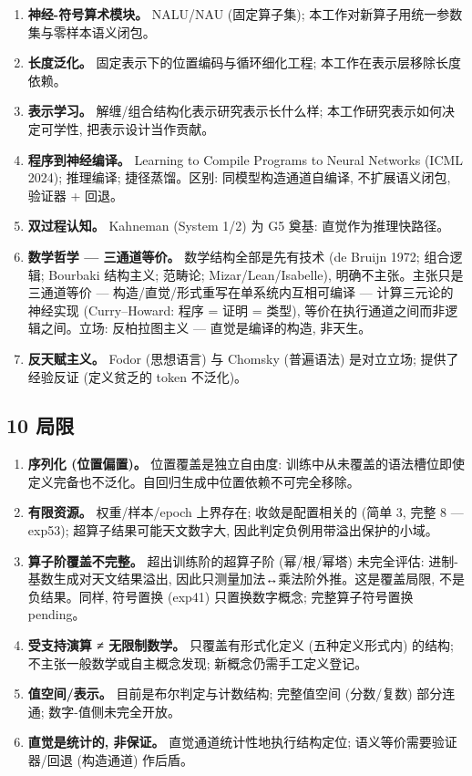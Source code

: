 \documentclass[
]{article}
\providecommand{\tightlist}{%
  \setlength{\itemsep}{0pt}\setlength{\parskip}{0pt}}
\begin{document}
\begin{enumerate}
  \textbf{系统化泛化。} Lake et al.~2017; Keysers et al.~2020 (COGS);
  SCAN。这些记录现象; 本工作提供成因 (泛化为何、何时成立)
  作为形式化归纳。
\item
  \textbf{神经-符号算术模块。} NALU/NAU (固定算子集);
  本工作对新算子用统一参数集与零样本语义闭包。
\item
  \textbf{长度泛化。} 固定表示下的位置编码与循环细化工程;
  本工作在表示层移除长度依赖。
\item
  \textbf{表示学习。} 解缠/组合结构化表示研究表示长什么样;
  本工作研究表示如何决定可学性, 把表示设计当作贡献。
\item
  \textbf{程序到神经编译。} Learning to Compile Programs to Neural
  Networks (ICML 2024); 推理编译; 捷径蒸馏。区别: 同模型构造通道自编译,
  不扩展语义闭包, 验证器 + 回退。
\item
  \textbf{双过程认知。} Kahneman (System 1/2) 为 G5 奠基:
  直觉作为推理快路径。
\item
  \textbf{数学哲学 --- 三通道等价。} 数学结构全部是先有技术 (de Bruijn
  1972; 组合逻辑; Bourbaki 结构主义; 范畴论; Mizar/Lean/Isabelle),
  明确不主张。主张只是三通道等价 ---
  构造/直觉/形式重写在单系统内互相可编译 --- 计算三元论的神经实现
  (Curry--Howard: 程序 = 证明 = 类型),
  等价在执行通道之间而非逻辑之间。立场: 反柏拉图主义 ---
  直觉是编译的构造, 非天生。
\item
  \textbf{反天赋主义。} Fodor (思想语言) 与 Chomsky (普遍语法)
  是对立立场; 提供了经验反证 (定义贫乏的 token 不泛化)。
\end{enumerate}

\subsection{10 局限}\label{ux5c40ux9650}

\begin{enumerate}
\def\labelenumi{\arabic{enumi}.}
\tightlist
\item
  \textbf{序列化 (位置偏置)。} 位置覆盖是独立自由度:
  训练中从未覆盖的语法槽位即使定义完备也不泛化。自回归生成中位置依赖不可完全移除。
\item
  \textbf{有限资源。} 权重/样本/epoch 上界存在; 收敛是配置相关的 (简单
  3, 完整 8 --- exp53); 超算子结果可能天文数字大,
  因此判定负例用带溢出保护的小域。
\item
  \textbf{算子阶覆盖不完整。} 超出训练阶的超算子阶 (幂/根/幂塔)
  未完全评估: 进制-基数生成对天文结果溢出,
  因此只测量加法↔乘法阶外推。这是覆盖局限, 不是负结果。同样, 符号置换
  (exp41) 只置换数字概念; 完整算子符号置换 pending。
\item
  \textbf{受支持演算 ≠ 无限制数学。} 只覆盖有形式化定义 (五种定义形式内)
  的结构; 不主张一般数学或自主概念发现; 新概念仍需手工定义登记。
\item
  \textbf{值空间/表示。} 目前是布尔判定与计数结构; 完整值空间
  (分数/复数) 部分连通; 数字-值侧未完全开放。
\item
  \textbf{直觉是统计的, 非保证。} 直觉通道统计性地执行结构定位;
  语义等价需要验证器/回退 (构造通道) 作后盾。
\end{enumerate}
\end{document}
